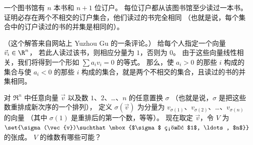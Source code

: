   \puzzle \item 
    \cite{Sheffer}
    一个图书馆有 $n$ 本书和 $n+1$ 位订户。
    每位订户都从该图书馆至少读过一本书。
    证明必存在两个不相交的订户集合，他们读过的书完全相同
    （也就是说，每个集合中的订户读过的书的并集是相同的）。
    \begin{answer}
      （这个解答来自网站上 Yuzhou Gu 的一条评论。）
      给每个人指定一个向量 $\vec{v}_i\in\R^n$，
      若此人读过该书，则相应分量为 $1$，否则为 $0$。
      由于这些向量线性相关，我们将得到一个形如 $\sum a_i v_i = 0$ 的等式。
      那么，使 $a_i>0$ 的那些 $i$ 构成的集合与使
      $a_i<0$ 的那些 $i$ 构成的集合，就是两个不相交的集合，且读过的书的并集相同。
    \end{answer}
  \puzzle \item 
    \cite{Wohascum47}
    对 $\Re^n$ 中任意向量 $\vec{v}$ 以及数 $1$、$2$、\ldots、$n$ 的任意置换 $\sigma$
    （也就是说，$\sigma$ 是把这些数重排成新次序的一个排列），
    定义 $\sigma(\vec{v})$ 为分量为
    $v_{\sigma(1)}$、$v_{\sigma(2)}$、\ldots{}、$v_{\sigma(n)}$ 的向量
    （其中 $\sigma(1)$ 是重排后的第一个数，等等）。
    现在取定 $\vec{v}$，令 $V$ 为
    $\set{\sigma(\vec{v})\suchthat \mbox{$\sigma$ 置换 $1$, \ldots, $n$}}$ 的张成。
    $V$ 的维数有哪些可能？
